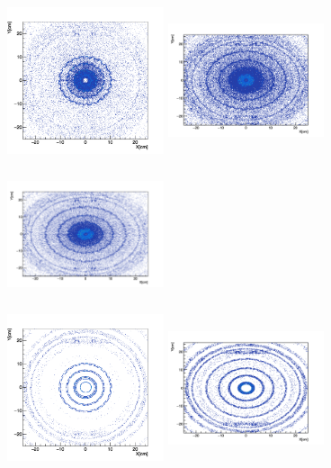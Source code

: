 \documentclass{cernatlasnote}
\begin{document}
  
\begin{figure}[htp]
\centering
\includegraphics[width=4.6cm, height=4.4cm]{images/emu_channel/2016/16_2D_plots/SecInt16_selc_eta_XY_25.png}
\includegraphics[width=4.6cm, height=4.4cm]{images/emu_channel/2017/17_2D_plots/SecInt17_eta_XY_25.png}
 \includegraphics[width=4.6cm, height=4.4cm]{images/emu_channel/2018/18_2D_plots/SecInt_XY_selc_eta.png}\\
 \includegraphics[width=4.6cm, height=4.4cm]{images/emu_channel/2016/16_2D_plots/SecInt16_tracker_match_eta_XY_25.png}
\includegraphics[width=4.6cm, height=4.4cm]{images/emu_channel/2017/17_2D_plots/SecInt17_eta_trackermatch_XY_24.png}

\end{figure}
\end{document}
